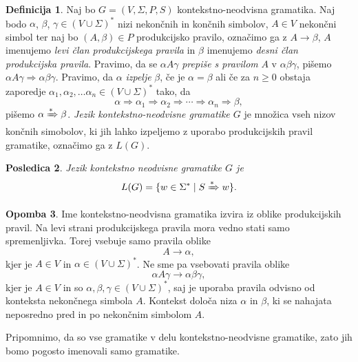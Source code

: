 \documentclass{amsart}
\theoremstyle{definition}
\newtheorem{definicija}{Definicija}[section]
\newtheorem{opomba}[definicija]{Opomba}
\theoremstyle{plain} %
\newtheorem{posledica}[definicija]{Posledica}
\begin{document}
\begin{definicija}
    
    Naj bo $ G = ( V, \Sigma, P, S ) $ kontekstno-neodvisna gramatika. Naj bodo $ \alpha $,
    $ \beta $, $ \gamma \in ( V \cup \Sigma )^* $ nizi nekončnih in končnih simbolov,
    $ A \in V $ nekončni simbol ter naj bo $ ( A, \beta ) \in P $ produkcijsko pravilo,
    označimo ga z $ A \rightarrow \beta $, $ A $ imenujemo \textit{levi član produkcijskega pravila} in $ \beta $
    imenujemo \textit{desni član produkcijska pravila}. Pravimo, da se $ \alpha A \gamma $ 
    \textit{prepiše s pravilom} $ A $ v $ \alpha\beta\gamma $, pišemo $ \alpha A \gamma  \Rightarrow 
    \alpha\beta\gamma $. Pravimo, da $ \alpha $ \textit{izpelje} $ \beta $, če je $ \alpha = \beta $ ali če
    za $ n \geq 0 $ obstaja zaporedje $ \alpha_1, \alpha_2, \ldots \alpha_n
    \in ( V \cup \Sigma )^* $ tako, da 
    \[
        \alpha \Rightarrow \alpha_1 \Rightarrow \alpha_2 \Rightarrow \cdots \Rightarrow \alpha_n
        \Rightarrow \beta,
    \]
    pišemo $ \alpha \xRightarrow{*} \beta $. \textit{Jezik kontekstno-neodvisne gramatike $ G $} je množica vseh nizov končnih simobolov,
    ki jih lahko izpeljemo z uporabo produkcijskih pravil gramatike, označimo ga z $ L(G) $.

\end{definicija}

\begin{posledica}

    Jezik kontekstno neodvisne gramatike $ G $ je
    \[
        L(G) = \{ w \in \Sigma^* \mid S \xRightarrow{*} w \}.
    \]

\end{posledica}

\begin{opomba}
    
    Ime kontekstno-neodvisna gramatika izvira iz oblike produkcijskih pravil. Na levi
    strani produkcijskega pravila mora vedno stati samo spremenljivka. Torej vsebuje samo
    pravila oblike
    \[
        A \rightarrow \alpha,
    \]
    kjer je  $ A \in V $ in $ \alpha \in ( V \cup \Sigma )^* $. Ne sme pa vsebovati
    pravila oblike
    \[
        \alpha A \gamma \rightarrow \alpha\beta\gamma,
    \]
    kjer je $ A \in V $ in so $ \alpha, \beta, \gamma \in ( V \cup \Sigma )^* $, saj je uporaba
    pravila odvisno od konteksta nekončnega simbola $ A $. Kontekst določa niza $ \alpha $ in $ \beta $,
    ki se nahajata neposredno pred in po nekončnim simbolom $ A $.

    Pripomnimo, da so vse gramatike v delu kontekstno-neodvisne gramatike, zato jih bomo pogosto imenovali
    samo gramatike.

\end{opomba}
\end{document}
